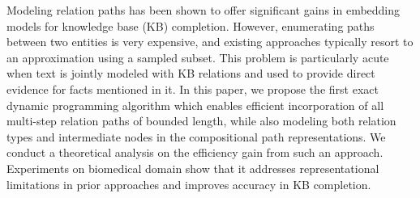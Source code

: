Modeling relation paths has been shown to offer significant gains in embedding models for knowledge base (KB) completion. However, enumerating paths between two entities is very expensive, and existing approaches typically resort to an approximation using a sampled subset. This problem is particularly acute when text is jointly modeled with KB relations and used to provide direct evidence for facts mentioned in it. In this paper, we propose the first exact dynamic programming algorithm which enables efficient incorporation of all multi-step relation paths of bounded length, while also modeling both relation types and intermediate nodes in the compositional path representations. We conduct a theoretical analysis on the efficiency gain from such an approach. Experiments on biomedical domain show that it addresses representational limitations in prior approaches and improves accuracy in KB completion.
